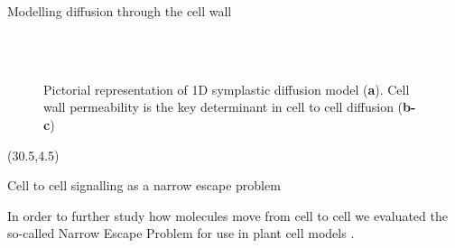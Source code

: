 \documentclass[final]{beamer}
\begin{document}
\begin{frame}{}
\begin{textblock}{28}
\begin{block}{Modelling diffusion through the cell wall}
      \begin{figure}[!ht]
        \centering
        \\
        \\

        \caption[1D symplastic diffusion model]{Pictorial
          representation of 1D symplastic diffusion model
          (\textbf{a}). Cell wall permeability is the key determinant
          in cell to cell diffusion (\textbf{b-c}) }
        \label{fig:diff}
      \end{figure}


    \end{block}



  \end{textblock}

  \begin{textblock}{28}(30.5,4.5)

    \begin{block}{Cell to cell signalling as a narrow escape problem}

      \begin{multicols}{2}

        In order to further study how molecules move from cell to cell
        we evaluated the so-called Narrow Escape Problem for use in
        plant cell models \cite{holcmanEscapeSmallOpening2004}.


\end{multicols}
\end{block}
\end{textblock}
\end{frame}
\end{document}
